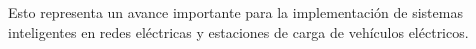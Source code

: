 Esto representa un avance importante para la implementación de sistemas inteligentes en redes eléctricas y estaciones de carga de vehículos eléctricos.

%
%
%
